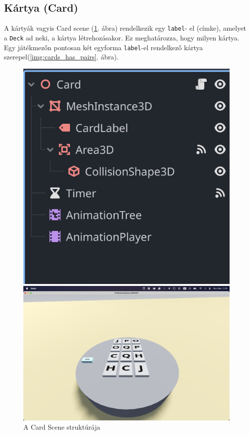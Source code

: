 \subsection{Kártya (Card)}
A kártyák vagyis Card scene (\ref{img:card_tree}. ábra) rendelkezik egy \lstinline|label|- el (címke), amelyet a \lstinline|Deck| ad neki, a kártya létrehozásakor. Ez meghatározza, hogy milyen kártya. 
Egy játékmezőn pontosan két egyforma \lstinline|label|-el rendelkező kártya szerepel(\ref{img:cards_has_pairs}. ábra).

\begin{figure}[H]
    \centering
    \begin{minipage}[b]{0.45\textwidth}
        \includegraphics[width=\textwidth]{img/cards_scene_tree.png}
        \caption{A Card Scene struktúrája}
        \label{img:card_tree}
    \end{minipage}
    \hfill
    \begin{minipage}[b]{0.45\textwidth}
        \includegraphics[width=\textwidth]{img/4x4_all_card_fliped.png}

\end{minipage}
\end{figure}
